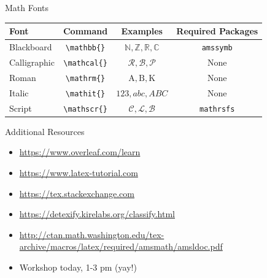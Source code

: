 \documentclass{beamer}
\begin{document}
\begin{frame}{Math Fonts}
	\begin{table}
		\centering
		\begin{tabular}{| l | c | c | c |}\hline
			Font & Command & Examples & Required Packages \\ \hline\hline
			Blackboard & \texttt{\textbackslash mathbb\{\}} & $\mathbb{N},\mathbb{Z},\mathbb{R},\mathbb{C}$ & \texttt{amssymb}\\ \hline
			Calligraphic & \texttt{\textbackslash mathcal\{\}} & $\mathcal{R},\mathcal{B},\mathcal{P}$ & None\\ \hline
			Roman & \texttt{\textbackslash mathrm\{\}} & $\mathrm{A},\mathrm{B},\mathrm{K}$& None\\ \hline
			Italic & \texttt{\textbackslash mathit\{\}} & $\mathit{123},\mathit{abc},\mathit{ABC}$& None\\ \hline
			Script & \texttt{\textbackslash mathscr\{\}} & $\mathscr{C},\mathscr{L},\mathscr{B}$ & \texttt{mathrsfs}\\ \hline
		\end{tabular}
	\end{table}
\end{frame}

\begin{frame}{Additional Resources}
	\begin{itemize}
		\item \url{https://www.overleaf.com/learn}
		\item \url{https://www.latex-tutorial.com}
		\item \url{https://tex.stackexchange.com}
		\item \url{https://detexify.kirelabs.org/classify.html}
		\item \url{http://ctan.math.washington.edu/tex-archive/macros/latex/required/amsmath/amsldoc.pdf}
		\item Workshop today, 1-3 pm (yay!)
	\end{itemize}
\end{frame}
\end{document}
